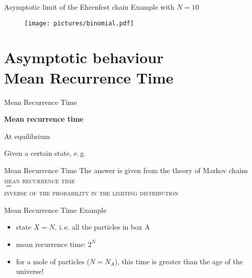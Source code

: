   \begin{frame}{Asymptotic limit of the Ehrenfest chain}
    \vspace{30pt}
    Example with $N = 10$
    \begin{figure}
      \texttt{[image: pictures/binomial.pdf]}
    \end{figure}
  \end{frame}

  \section{Asymptotic behaviour\\\small{Mean Recurrence Time}}
  \begin{frame}{Mean Recurrence Time}
    \begin{center}
      \Large \textbf{Mean recurrence time}
    \end{center}
    \alert<3>{At equilibrium}

    Given a certain state, e.\,g.

    \begin{figure}
      
    \end{figure}


    \begin{figure}
    \end{figure}
    
  \end{frame}

  \begin{frame}{Mean Recurrence Time}
    \centering
    The answer is given from the theory of Markov chains\\
    \vspace{20pt}
    \Large
    \alert{\textsc{mean recurrence time}}\\ \alert{$=$} \\
    \large
    \alert{\textsc{inverse of the probability in the limiting distribution}}
  \end{frame}

  \begin{frame}{Mean Recurrence Time}
    Example
    \begin{itemize}
      \item state $X = N$, i.\,e. all the particles in box A
    \end{itemize}

    \begin{figure}
      
    \end{figure}

    \begin{itemize}
      \item mean recurrence time: \alert{$2^N$}
      \item for a mole of particles ($N = N_A$), this time is greater than the age of the universe!
    \end{itemize}
  \end{frame}

